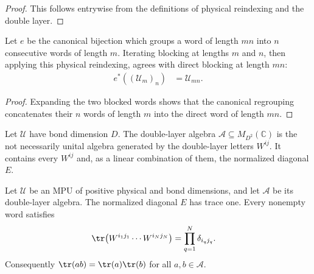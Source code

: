\begin{proof}\leanok
    This follows entrywise from the definitions of physical reindexing and the
    double layer.
\end{proof}

\begin{lemma}
    \label{lem:mpu_iterated_physical_blocking}
    \leanok
    Let $e$ be the canonical bijection which groups a word of length $mn$ into
    $n$ consecutive words of length $m$. Iterating blocking at lengths $m$ and
    $n$, then applying this physical reindexing, agrees with direct blocking at
    length $mn$:
    \begin{align}
        e^*((\mathcal U_m)_n) & =\mathcal U_{mn}.
    \end{align}
\end{lemma}

\begin{proof}\leanok
    Expanding the two blocked words shows that the canonical regrouping concatenates their
    $n$ words of length $m$ into the direct word of length $mn$.
\end{proof}

\begin{definition}
    \label{def:mpu_double_layer_algebra}
    \leanok
    Let $\mathcal U$ have bond dimension $D$.  The double-layer algebra
    $\mathcal A\subseteq M_{D^2}(\mathbb C)$ is the not necessarily unital
    algebra generated by the double-layer letters $W^{ij}$.  It contains every
    $W^{ij}$ and, as a linear combination of them, the normalized diagonal
    $E$.
\end{definition}

\begin{lemma}
    \label{thm:mpu_double_layer_trace_character}
    \leanok
    Let $\mathcal U$ be an MPU of positive physical and bond dimensions, and
    let $\mathcal A$ be its double-layer algebra.  The normalized diagonal $E$
    has trace one.  Every nonempty word satisfies
    \begin{align}
        \tr\bigl(W^{i_1j_1}\cdots W^{i_Nj_N}\bigr)
         & =\prod_{q=1}^{N}\delta_{i_qj_q}.
    \end{align}
    Consequently $\tr(ab)=\tr(a)\tr(b)$ for all $a,b\in\mathcal A$.
\end{lemma}

